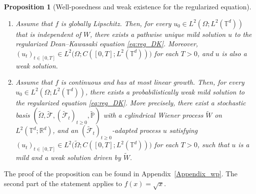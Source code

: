 \documentclass[a4paper,12pt]{article}
\newtheorem{proposition}[theorem]{Proposition}
\begin{document}
\begin{proposition}[Well-posedness and weak existence for the regularized equation]\label{prop:wp}


\leavevmode\par
\begin{enumerate}

\item[i)] Assume that $f$ is globally Lipschitz. Then, for every $u_0\in L^2(\Omega;L^2(\mathbb T^d))$  that is  independent of $W$, there exists a pathwise unique  mild solution $u$ to the regularized Dean--Kawasaki equation \eqref{eq:reg_DK}. Moreover, $(u_t)_{t \in [0,T]}\in L^2\bigl(\Omega;C([0,T];L^2(\mathbb T^d))\bigr)$ for each $T>0$, and $u$ is also a weak solution. 

\item[ii)] Assume  that $f$ is continuous and has at most linear growth. %
Then, for every $u_0 \in L^2(\Omega;L^2(\mathbb T^d))$, there exists a
probabilistically weak mild solution to the regularized equation \eqref{eq:reg_DK}. More precisely, there exist a stochastic basis $(\tilde\Omega,\tilde{\mathcal F},
(\tilde{\mathcal F}_t)_{t\ge0},\tilde{\mathbb P})$ with a cylindrical Wiener process $\tilde W$ on $L^2(\mathbb{T}^d;\mathbb{R}^d)$, and an
$(\tilde{\mathcal F}_t)_{t\ge0}$-adapted process $u$ satisfying $(u_t)_{t \in [0,T]}\in L^2\bigl(\tilde\Omega;C([0,T];L^2(\mathbb T^d))\bigr)$ for each $T>0$, 
such that $u$ is a mild and a weak solution driven by $\tilde{W}$.
\end{enumerate}
\end{proposition}



The proof of the proposition can be found in Appendix~\ref{Appendix_wp}. The second part of the statement applies to $f(x) = \sqrt{x}$.
\end{document}
